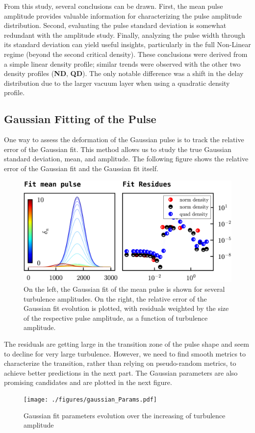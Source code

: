 \documentclass[11pt,a4paper,openany]{report}
\begin{document}
\begin{multicols}{2}
    From this study, several conclusions can be drawn. First, the mean pulse amplitude provides valuable information for characterizing the pulse amplitude distribution. Second, evaluating the pulse standard deviation is somewhat redundant with the amplitude study. Finally, analyzing the pulse width through its standard deviation can yield useful insights, particularly in the full Non-Linear regime (beyond the second critical density). These conclusions were derived from a simple linear density profile; similar trends were observed with the other two density profiles (\textbf{ND}, \textbf{QD}). The only notable difference was a shift in the delay distribution due to the larger vacuum layer when using a quadratic density profile.

    \subsection{Gaussian Fitting of the Pulse}

    One way to assess the deformation of the Gaussian pulse is to track the relative error of the Gaussian fit. This method allows us to study the true Gaussian standard deviation, mean, and amplitude. The following figure shows the relative error of the Gaussian fit and the Gaussian fit itself.
    \begin{figure}[H]
        \centering
        \includegraphics[width=1\linewidth]{./figures/gaussian_fit.png}
        \caption{On the left, the Gaussian fit of the mean pulse is shown for several turbulence amplitudes. On the right, the relative error of the Gaussian fit evolution is plotted, with residuals weighted by the size of the respective pulse amplitude, as a function of turbulence amplitude.}
        \label{}
    \end{figure}
    The residuals are getting large in the transition zone of the pulse shape and seem to decline for very large turbulence. However, we need to find smooth metrics to characterize the transition, rather than relying on pseudo-random metrics, to achieve better predictions in the next part. The Gaussian parameters are also promising candidates and are plotted in the next figure.
    \begin{figure}[H]
        \centering
        \texttt{[image: ./figures/gaussian\_Params.pdf]}
        \caption{Gaussian fit parameters evolution over the increasing of turbulence amplitude}
        \label{}
    \end{figure}


\end{multicols}
\end{document}
